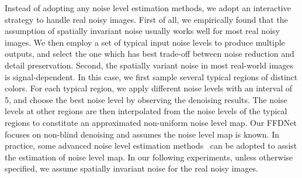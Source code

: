 \documentclass[journal]{IEEEtran}
\begin{document}
Instead of adopting any noise level estimation methods, we adopt an interactive strategy to handle real noisy images. First of all, we empirically found that the assumption of spatially invariant noise usually works well for most real noisy images. We then employ a set of typical input noise levels to produce multiple outputs, and select the one which has best trade-off between noise reduction and detail preservation.
Second, the spatially variant noise in most real-world images is signal-dependent. In this case, we first sample several typical regions of distinct colors. For each typical region, we apply different noise levels with an interval of 5, and choose the best noise level by observing the denoising results. The noise levels at other regions are then interpolated from the noise levels of the typical regions to constitute an approximated non-uniform noise level map. Our FFDNet focuses on non-blind denoising and assumes the noise level map is known. In practice, some advanced noise level estimation methods~\cite{liu2008automatic,azzari2014} can be adopted to assist the estimation of noise level map.
In our following experiments, unless otherwise specified, we assume spatially invariant noise for the real noisy images.
\end{document}
